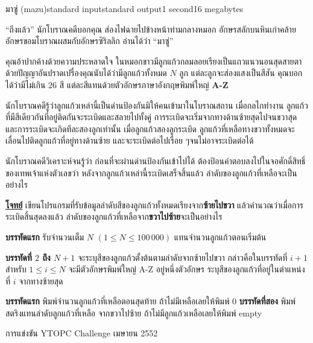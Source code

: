 \documentclass[11pt,a4paper]{article}
\begin{document}
\begin{problem}{มาซู่ (mazu)}{standard input}{standard output}{1 second}{16 megabytes}

   “ถึงแล้ว” นักโบราณคดีบอกคุณ ส่องไฟฉายไปข้างหน้าท่ามกลางหมอก อักษรสลักบนหินเก่าคล้ายอักษรขอมโบราณผสมกับอักษรซิริลลิก อ่านได้ว่า “มาซู่”
   
   
    คุณอ้าปากค้างด้วยความประหลาดใจ ในหมอกขาวมีลูกแก้วกลมลอยเรียงเป็นแถวแนวนอนสุดสายตา ด้วยปัญญาอันปราดเปรื่องคุณนับได้ว่ามีลูกแก้วทั้งหมด $N$ ลูก แต่ละลูกจะส่องแสงเป็นสีสัน คุณบอกได้ว่ามีไม่เกิน $26$ สี แต่ละสีแทนด้วยตัวอักษรภาษาอังกฤษพิมพ์ใหญ่ \textbf{A-Z}
    
    
    นักโบราณคดีรู้ว่าลูกแก้วเหล่านี้เป็นด่านป้องกันมิให้คนเข้ามาในโบราณสถาน เมื่อกลไกทำงาน ลูกแก้วที่มีสีเดียวกันที่อยู่ติดกันจะระเบิดและสลายไปทั้งคู่  การระเบิดจะเริ่มจากทางด้านซ้ายสุดไปจนขวาสุด และการระเบิดจะเกิดทีละสองลูกเท่านั้น  เมื่อลูกแก้วสองลูกระเบิด ลูกแก้วที่เหลือทางขวาทั้งหมดจะเลื่อนไปติดลูกแก้วที่อยู่ทางด้านซ้าย  และจะระเบิดต่อไปเรื่อย ๆจนไม่อาจระเบิดต่อได้
    
    
    นักโบราณคดีวิเคราะห์จนรู้ว่า ก่อนที่จะผ่านด่านป้องกันเข้าไปได้ ต้องป้อนคำตอบลงไปในจอศักดิ์สิทธิ์ของเทพเจ้าแห่งตัวเลขว่า หลังจากลูกแก้วเหล่านี้ระเบิดเสร็จสิ้นแล้ว ลำดับของลูกแก้วที่เหลือจะเป็นอย่างไร

\bigskip
\underline{\textbf{โจทย์}}   เขียนโปรแกรมที่รับข้อมูลลำดับสีของลูกแก้วทั้งหมดเรียงจาก\textbf{ซ้ายไปขวา}  แล้วคำนวณว่าเมื่อการระเบิดสิ้นสุดลงแล้ว ลำดับของลูกแก้วที่เหลือจาก\textbf{ขวาไปซ้าย}จะเป็นอย่างไร

\InputFile

\textbf{บรรทัดแรก} รับจำนวนเต็ม $N$ $(1 \leq N \leq 100\,000)$ แทนจำนวนลูกแก้วตอนเริ่มต้น

\textbf{บรรทัดที่ $2$ ถึง $N+1$} จะระบุสีของลูกแก้วตั้งต้นตามลำดับจากซ้ายไปขวา กล่าวคือในบรรทัดที่ $i + 1$ สำหรับ $1 \leq i \leq N$ จะมีตัวอักษรพิมพ์ใหญ่ A-Z อยู่หนึ่งตัวอักษร ระบุสีของลูกแก้วที่อยู่ในตำแหน่งที่ $i$ จากทางซ้ายสุด


\OutputFile

\textbf{บรรทัดแรก} พิมพ์จำนวนลูกแก้วที่เหลือตอนสุดท้าย ถ้าไม่มีเหลือเลยให้พิมพ์ $0$
\textbf{บรรทัดที่สอง} พิมพ์สตริงแทนลำดับลูกแก้วที่เหลือ จากขวาไปซ้าย ถ้าไม่มีลูกแก้วเหลือเลยให้พิมพ์ empty

\Examples

\begin{example}
%
%
\end{example}


\Source

การแข่งขัน YTOPC Challenge เมษายน 2552


\end{problem}
\end{document}

